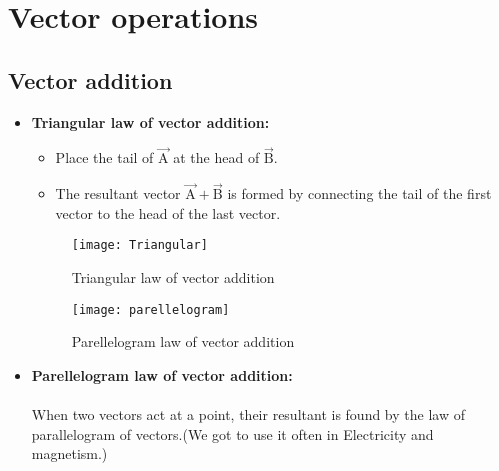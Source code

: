 \section{Vector operations}
\subsection{Vector addition}
\begin{itemize}
	\item 	\textbf{Triangular law of vector addition:}
	\begin{itemize}
		\item Place the tail of $\vec{\mathrm A}$ at the head of $\vec{\mathrm B} $.
		\item The resultant vector $\vec{\mathrm A}+\vec{\mathrm B}$ is formed by connecting the tail of the first vector to the head of the last vector. 
	\end{itemize}
\begin{figure}[H]
	\begin{minipage}{0.45\textwidth}
		\centering
		\texttt{[image: Triangular]}
		\caption{Triangular law of vector addition}
		\end{minipage}\hfil
	\begin{minipage}{0.45\textwidth}
	\centering
	\texttt{[image: parellelogram]}
	\caption{Parellelogram law of vector addition}
\end{minipage}

\end{figure}

\item \textbf{Parellelogram law of vector addition:}
\\ \\When two vectors act at a point, their resultant is found by the law of parallelogram of vectors.(We got to use it often in Electricity and magnetism.)


\end{itemize}
